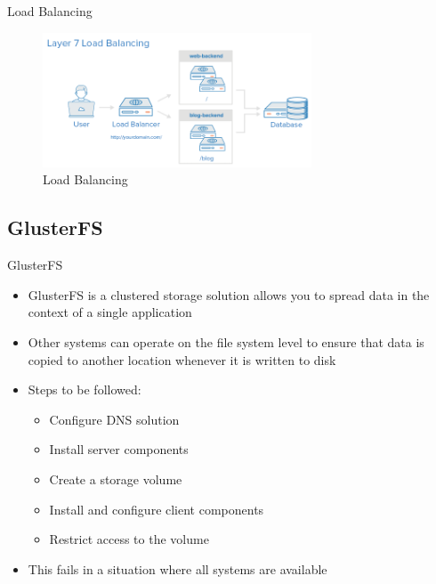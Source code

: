 \documentclass[10pt,xcolor=dvipsnames]{beamer}
\begin{document}
\begin{frame}{Load Balancing}
\begin{figure}[H]
\begin{center}
\includegraphics[width=8cm,height=4cm]{Layer7LoadBalancing.PNG}
\caption{Load Balancing }
\end{center}
\end{figure}
\end{frame}

\subsection{GlusterFS}

\begin{frame}{GlusterFS}
\begin{itemize}
\item GlusterFS is a clustered storage solution allows you to spread data in the context of a single application
\item Other systems can operate on the file system level to ensure that data is copied to another location whenever it is written to disk
\item Steps to be followed:
\begin{itemize}
 	\item  Configure DNS solution
	\item Install server components
	\item Create a storage volume
 	\item Install and configure client components
	\item Restrict access to the volume
\end{itemize}
\item  This fails in a situation where all systems are available
\end{itemize}
\end{frame}
\end{document}
